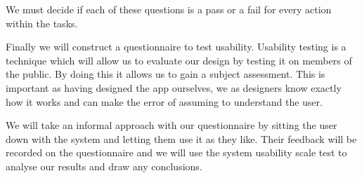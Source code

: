 We must decide if each of these questions is a pass or a fail for every action
within the tasks.

Finally we will construct a questionnaire to test usability.  Usability testing
is a technique which will allow us to evaluate our design by testing it on
members of the public. By doing this it allows us to gain a subject assessment.
This is important as having designed the app ourselves, we as designers know
exactly how it works and can make the error of assuming to understand the user.

We will take an informal approach with our questionnaire by sitting the user
down with the system and letting them use it as they like. Their feedback will
be recorded on the questionnaire and we will use the system usability scale
test to analyse our results and draw any conclusions.
